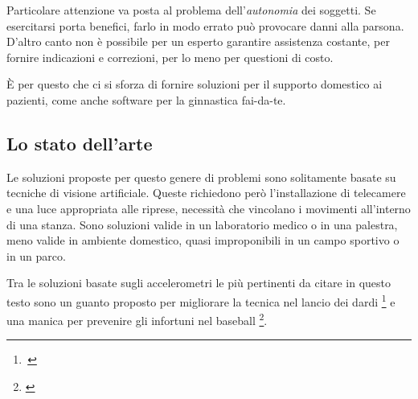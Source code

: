 Particolare attenzione va posta al problema dell'\emph{autonomia} dei soggetti.
Se esercitarsi porta benefici, farlo in modo errato può provocare danni alla parsona.
D'altro canto non è possibile per un esperto garantire assistenza costante,
per fornire indicazioni e correzioni, per lo meno per questioni di costo.

È per questo che ci si sforza di fornire soluzioni per il supporto domestico ai pazienti,
come anche software per la ginnastica fai-da-te.




	\subsection{Lo stato dell'arte}
Le soluzioni proposte per questo genere di problemi
sono solitamente basate su tecniche di visione artificiale.
Queste richiedono però l'installazione di telecamere
e una luce appropriata alle riprese,
necessità che vincolano i movimenti all'interno di una stanza.
Sono soluzioni valide in un laboratorio medico o in una palestra,
meno valide in ambiente domestico,
quasi improponibili in un campo sportivo o in un parco.



Tra le soluzioni basate sugli accelerometri
le più pertinenti da citare in questo testo
sono un guanto proposto per migliorare la tecnica
nel lancio dei dardi \footnote{\,\cite{cit:guanto}}
e una manica per prevenire gli infortuni nel baseball \footnote{\cite{cit:manica}}.





